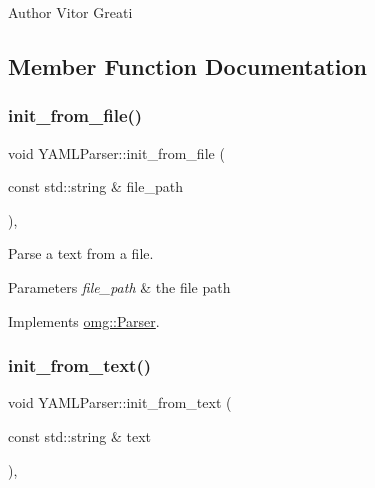 \begin{DoxyAuthor}{Author}
Vitor Greati 
\end{DoxyAuthor}


\subsection{Member Function Documentation}
\mbox{\label{classomg_1_1_y_a_m_l_parser_a88af0bc72d0f4ce3e9e489e0b6037a53}} 
\subsubsection{\texorpdfstring{init\_from\_file()}{init\_from\_file()}}
{\footnotesize\ttfamily void Y\+A\+M\+L\+Parser\+::init\+\_\+from\+\_\+file (\begin{DoxyParamCaption}\item[{const std\+::string \&}]{file\+\_\+path }\end{DoxyParamCaption})\hspace{0.3cm}{\ttfamily [override]}, {\ttfamily [virtual]}}



Parse a text from a file. 


\begin{DoxyParams}{Parameters}
{\em file\+\_\+path} & the file path \\
\hline
\end{DoxyParams}


Implements \mbox{\hyperlink{classomg_1_1_parser_aa0c44ed0f01edc2958667589d66ebe8a}{omg\+::\+Parser}}.

\mbox{\label{classomg_1_1_y_a_m_l_parser_a625f697e850b8d027095d74f7fe65acc}} 
\subsubsection{\texorpdfstring{init\_from\_text()}{init\_from\_text()}}
{\footnotesize\ttfamily void Y\+A\+M\+L\+Parser\+::init\+\_\+from\+\_\+text (\begin{DoxyParamCaption}\item[{const std\+::string \&}]{text }\end{DoxyParamCaption})\hspace{0.3cm}{\ttfamily [override]}, {\ttfamily [virtual]}}



